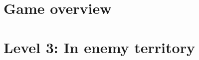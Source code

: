 \documentclass[12pt]{report}
\begin{document}


\tableofcontents

\part{Game overview}











\part{Level 3: In enemy territory}











%
%
%  
%  
%
%  
%  
%
\end{document}

